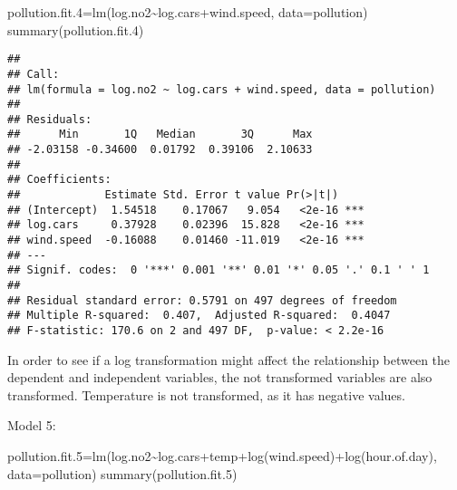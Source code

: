 \documentclass[
]{article}
\newenvironment{Shaded}{\begin{snugshade}}{\end{snugshade}}
\newcommand{\AttributeTok}[1]{\textcolor[rgb]{0.77,0.63,0.00}{#1}}
\newcommand{\FloatTok}[1]{\textcolor[rgb]{0.00,0.00,0.81}{#1}}
\newcommand{\FunctionTok}[1]{\textcolor[rgb]{0.00,0.00,0.00}{#1}}
\newcommand{\NormalTok}[1]{#1}
\newcommand{\OtherTok}[1]{\textcolor[rgb]{0.56,0.35,0.01}{#1}}
\newcommand{\SpecialCharTok}[1]{\textcolor[rgb]{0.00,0.00,0.00}{#1}}
\begin{document}
\begin{Shaded}
\begin{Highlighting}[]
\NormalTok{pollution.fit}\FloatTok{.4}\OtherTok{=}\FunctionTok{lm}\NormalTok{(log.no2}\SpecialCharTok{\textasciitilde{}}\NormalTok{log.cars}\SpecialCharTok{+}\NormalTok{wind.speed, }\AttributeTok{data=}\NormalTok{pollution)}
\FunctionTok{summary}\NormalTok{(pollution.fit}\FloatTok{.4}\NormalTok{)}
\end{Highlighting}
\end{Shaded}

\begin{verbatim}
## 
## Call:
## lm(formula = log.no2 ~ log.cars + wind.speed, data = pollution)
## 
## Residuals:
##      Min       1Q   Median       3Q      Max 
## -2.03158 -0.34600  0.01792  0.39106  2.10633 
## 
## Coefficients:
##             Estimate Std. Error t value Pr(>|t|)    
## (Intercept)  1.54518    0.17067   9.054   <2e-16 ***
## log.cars     0.37928    0.02396  15.828   <2e-16 ***
## wind.speed  -0.16088    0.01460 -11.019   <2e-16 ***
## ---
## Signif. codes:  0 '***' 0.001 '**' 0.01 '*' 0.05 '.' 0.1 ' ' 1
## 
## Residual standard error: 0.5791 on 497 degrees of freedom
## Multiple R-squared:  0.407,  Adjusted R-squared:  0.4047 
## F-statistic: 170.6 on 2 and 497 DF,  p-value: < 2.2e-16
\end{verbatim}

In order to see if a log transformation might affect the relationship
between the dependent and independent variables, the not transformed
variables are also transformed. Temperature is not transformed, as it
has negative values.

Model 5:

\begin{Shaded}
\begin{Highlighting}[]
\NormalTok{pollution.fit}\FloatTok{.5}\OtherTok{=}\FunctionTok{lm}\NormalTok{(log.no2}\SpecialCharTok{\textasciitilde{}}\NormalTok{log.cars}\SpecialCharTok{+}\NormalTok{temp}\SpecialCharTok{+}\FunctionTok{log}\NormalTok{(wind.speed)}\SpecialCharTok{+}\FunctionTok{log}\NormalTok{(hour.of.day), }\AttributeTok{data=}\NormalTok{pollution)}
\FunctionTok{summary}\NormalTok{(pollution.fit}\FloatTok{.5}\NormalTok{)}
\end{Highlighting}
\end{Shaded}
\end{document}
